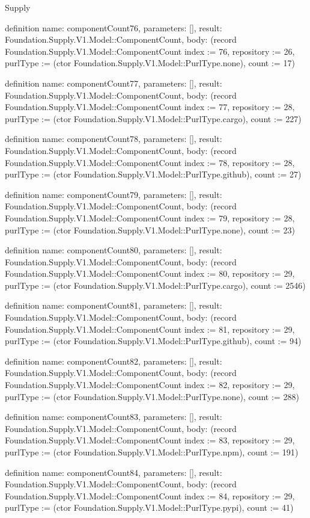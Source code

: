 \begin{lexlean}{Supply}
\begin{semanticmodule}
definition{
  name: componentCount76,
  parameters: [],
  result: Foundation.Supply.V1.Model::ComponentCount,
  body: (record Foundation.Supply.V1.Model::ComponentCount {index := 76, repository := 26, purlType := (ctor Foundation.Supply.V1.Model::PurlType.none), count := 17})
}

definition{
  name: componentCount77,
  parameters: [],
  result: Foundation.Supply.V1.Model::ComponentCount,
  body: (record Foundation.Supply.V1.Model::ComponentCount {index := 77, repository := 28, purlType := (ctor Foundation.Supply.V1.Model::PurlType.cargo), count := 227})
}

definition{
  name: componentCount78,
  parameters: [],
  result: Foundation.Supply.V1.Model::ComponentCount,
  body: (record Foundation.Supply.V1.Model::ComponentCount {index := 78, repository := 28, purlType := (ctor Foundation.Supply.V1.Model::PurlType.github), count := 27})
}

definition{
  name: componentCount79,
  parameters: [],
  result: Foundation.Supply.V1.Model::ComponentCount,
  body: (record Foundation.Supply.V1.Model::ComponentCount {index := 79, repository := 28, purlType := (ctor Foundation.Supply.V1.Model::PurlType.none), count := 23})
}

definition{
  name: componentCount80,
  parameters: [],
  result: Foundation.Supply.V1.Model::ComponentCount,
  body: (record Foundation.Supply.V1.Model::ComponentCount {index := 80, repository := 29, purlType := (ctor Foundation.Supply.V1.Model::PurlType.cargo), count := 2546})
}

definition{
  name: componentCount81,
  parameters: [],
  result: Foundation.Supply.V1.Model::ComponentCount,
  body: (record Foundation.Supply.V1.Model::ComponentCount {index := 81, repository := 29, purlType := (ctor Foundation.Supply.V1.Model::PurlType.github), count := 94})
}

definition{
  name: componentCount82,
  parameters: [],
  result: Foundation.Supply.V1.Model::ComponentCount,
  body: (record Foundation.Supply.V1.Model::ComponentCount {index := 82, repository := 29, purlType := (ctor Foundation.Supply.V1.Model::PurlType.none), count := 288})
}

definition{
  name: componentCount83,
  parameters: [],
  result: Foundation.Supply.V1.Model::ComponentCount,
  body: (record Foundation.Supply.V1.Model::ComponentCount {index := 83, repository := 29, purlType := (ctor Foundation.Supply.V1.Model::PurlType.npm), count := 191})
}

definition{
  name: componentCount84,
  parameters: [],
  result: Foundation.Supply.V1.Model::ComponentCount,
  body: (record Foundation.Supply.V1.Model::ComponentCount {index := 84, repository := 29, purlType := (ctor Foundation.Supply.V1.Model::PurlType.pypi), count := 41})
}


\end{semanticmodule}
\end{lexlean}
